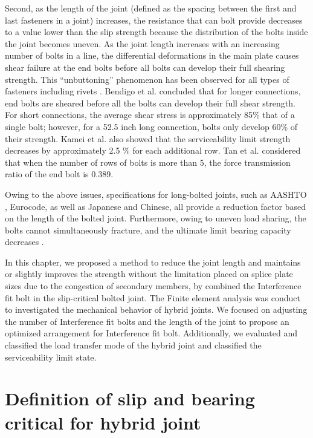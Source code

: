 Second, as the length of the joint (defined as the spacing between the first and last fasteners in a joint) increases, the resistance that can bolt provide decreases to a value lower than the slip strength because the distribution of the bolts inside the joint becomes uneven. As the joint length increases with an increasing number of bolts in a line, the differential deformations in the main plate causes shear failure at the end bolts before all bolts can develop their full shearing strength. This ``unbuttoning'' phenomenon has been observed for all types of fasteners including rivets \cite{fisher1965behavior}. Bendigo et al.\cite{bendigo1963long} concluded that for longer connections, end bolts are sheared before all the bolts can develop their full shear strength. For short connections, the average shear stress is approximately 85\% that of a single bolt; however, for a 52.5 inch long connection, bolts only develop 60\% of their strength. Kamei et al. \cite{KAMEI2000} also showed that the serviceability limit strength decreases by approximately 2.5 $\%$ for each additional row.  Tan et al.\cite{Tan2022} considered that when the number of rows of bolts is more than 5, the force transmission ratio of the end bolt is 0.389.

Owing to the above issues, specifications for long-bolted joints, such as AASHTO , Eurocode, as well as Japanese and Chinese, all provide a reduction factor based on the length of the bolted joint\cite{AASHTO2020,eccs1985,isohtb,eurocode3-21,douji2017}. Furthermore, owing to uneven load sharing, the bolts cannot simultaneously fracture, and the ultimate limit bearing capacity decreases \cite{Takai2021BoltUnbuttoning,Peng2013FeaDimensions,peng2010,longstainless2022}. 

In this chapter, we proposed a method to reduce the joint length and maintains or slightly improves the strength without the limitation placed on splice plate sizes due to the congestion of secondary members, by combined the Interference fit bolt in the slip-critical bolted joint. The Finite element analysis was conduct to investigated the mechanical behavior of hybrid joints. We focused on adjusting the number of Interference fit bolts and the length of the joint to propose an optimized arrangement for Interference fit bolt. Additionally, we evaluated and classified the load transfer mode of the hybrid joint and classified the serviceability limit state.


\section{Definition of slip and bearing critical for hybrid joint}

